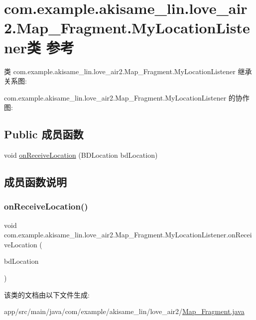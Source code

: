 \hypertarget{classcom_1_1example_1_1akisame__lin_1_1love__air2_1_1_map___fragment_1_1_my_location_listener}{}\section{com.\+example.\+akisame\+\_\+lin.\+love\+\_\+air2.\+Map\+\_\+\+Fragment.\+My\+Location\+Listener类 参考}
\label{classcom_1_1example_1_1akisame__lin_1_1love__air2_1_1_map___fragment_1_1_my_location_listener}


类 com.\+example.\+akisame\+\_\+lin.\+love\+\_\+air2.\+Map\+\_\+\+Fragment.\+My\+Location\+Listener 继承关系图\+:


com.\+example.\+akisame\+\_\+lin.\+love\+\_\+air2.\+Map\+\_\+\+Fragment.\+My\+Location\+Listener 的协作图\+:
\subsection*{Public 成员函数}
\begin{DoxyCompactItemize}
\item 
void \mbox{\hyperlink{classcom_1_1example_1_1akisame__lin_1_1love__air2_1_1_map___fragment_1_1_my_location_listener_a2de3d83e6716af76296975299fcb4775}{on\+Receive\+Location}} (B\+D\+Location bd\+Location)
\end{DoxyCompactItemize}


\subsection{成员函数说明}
\mbox{\label{classcom_1_1example_1_1akisame__lin_1_1love__air2_1_1_map___fragment_1_1_my_location_listener_a2de3d83e6716af76296975299fcb4775}} 
\subsubsection{\texorpdfstring{onReceiveLocation()}{onReceiveLocation()}}
{\footnotesize\ttfamily void com.\+example.\+akisame\+\_\+lin.\+love\+\_\+air2.\+Map\+\_\+\+Fragment.\+My\+Location\+Listener.\+on\+Receive\+Location (\begin{DoxyParamCaption}\item[{B\+D\+Location}]{bd\+Location }\end{DoxyParamCaption})\hspace{0.3cm}{\ttfamily [inline]}}



该类的文档由以下文件生成\+:\begin{DoxyCompactItemize}
\item 
app/src/main/java/com/example/akisame\+\_\+lin/love\+\_\+air2/\mbox{\hyperlink{_map___fragment_8java}{Map\+\_\+\+Fragment.\+java}}\end{DoxyCompactItemize}
